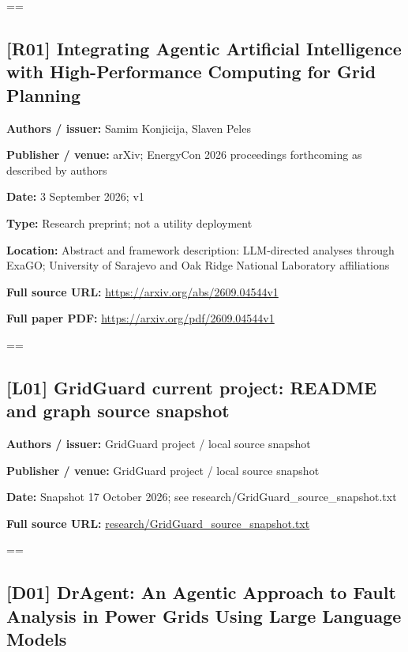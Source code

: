 \documentclass[10pt,letterpaper]{article}
\begin{document}
\setbox\readingEntry=\vbox\bgroup\hsize=\linewidth\subsection*{[R01] Integrating Agentic Artificial Intelligence with High-Performance Computing for Grid Planning}
\textbf{Authors / issuer:} Samim Konjicija, Slaven Peles\par
\textbf{Publisher / venue:} arXiv; EnergyCon 2026 proceedings forthcoming as described by authors\par
\textbf{Date:} 3 September 2026; v1\par
\textbf{Type:} Research preprint; not a utility deployment\par
\textbf{Location:} Abstract and framework description: LLM-directed analyses through ExaGO; University of Sarajevo and Oak Ridge National Laboratory affiliations\par
\textbf{Full source URL:} \href{https://arxiv.org/abs/2609.04544v1}{\small\ttfamily https:/\allowbreak{}/\allowbreak{}arxiv.\allowbreak{}org/\allowbreak{}abs/\allowbreak{}2609.\allowbreak{}04544v1}\par
\textbf{Full paper PDF:} \href{https://arxiv.org/pdf/2609.04544v1}{\small\ttfamily https:/\allowbreak{}/\allowbreak{}arxiv.\allowbreak{}org/\allowbreak{}pdf/\allowbreak{}2609.\allowbreak{}04544v1}\par
\egroup\par\noindent\box\readingEntry\par\medskip
\setbox\readingEntry=\vbox\bgroup\hsize=\linewidth\subsection*{[L01] GridGuard current project: README and graph source snapshot}
\textbf{Authors / issuer:} GridGuard project / local source snapshot\par
\textbf{Publisher / venue:} GridGuard project / local source snapshot\par
\textbf{Date:} Snapshot 17 October 2026; see research/GridGuard\_source\_snapshot.txt\par
\textbf{Full source URL:} \href{../research/GridGuard_source_snapshot.txt}{\small\ttfamily research/\allowbreak{}GridGuard\_\allowbreak{}source\_\allowbreak{}snapshot.\allowbreak{}txt}\par
\egroup\par\noindent\box\readingEntry\par\medskip
\setbox\readingEntry=\vbox\bgroup\hsize=\linewidth\subsection*{[D01] DrAgent: An Agentic Approach to Fault Analysis in Power Grids Using Large Language Models}
\end{document}
